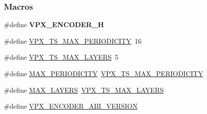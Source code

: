 \subsubsection*{Macros}
\begin{DoxyCompactItemize}
\item 
\hypertarget{group__encoder_gad1f3154e8dfc7058a43a4a8d3c94b8fd}{\#define {\bfseries V\-P\-X\-\_\-\-E\-N\-C\-O\-D\-E\-R\-\_\-\-H}}\label{group__encoder_gad1f3154e8dfc7058a43a4a8d3c94b8fd}

\item 
\#define \hyperlink{group__encoder_ga684b48cb6e47a258247637186557eb19}{V\-P\-X\-\_\-\-T\-S\-\_\-\-M\-A\-X\-\_\-\-P\-E\-R\-I\-O\-D\-I\-C\-I\-T\-Y}~16
\item 
\#define \hyperlink{group__encoder_ga2715ac3dd8bf2f5438c4bbfc82788eb2}{V\-P\-X\-\_\-\-T\-S\-\_\-\-M\-A\-X\-\_\-\-L\-A\-Y\-E\-R\-S}~5
\item 
\#define \hyperlink{group__encoder_gae6569d89cc61cb190aeeb00a1b40ad88}{M\-A\-X\-\_\-\-P\-E\-R\-I\-O\-D\-I\-C\-I\-T\-Y}~\hyperlink{group__encoder_ga684b48cb6e47a258247637186557eb19}{V\-P\-X\-\_\-\-T\-S\-\_\-\-M\-A\-X\-\_\-\-P\-E\-R\-I\-O\-D\-I\-C\-I\-T\-Y}
\item 
\#define \hyperlink{group__encoder_gade9d4b2ac5f29fe89ffea40e7c58c9d6}{M\-A\-X\-\_\-\-L\-A\-Y\-E\-R\-S}~\hyperlink{group__encoder_ga2715ac3dd8bf2f5438c4bbfc82788eb2}{V\-P\-X\-\_\-\-T\-S\-\_\-\-M\-A\-X\-\_\-\-L\-A\-Y\-E\-R\-S}
\item 
\hypertarget{group__encoder_gaa4f0b52293c08ba672429c3a03648b9d}{\#define \hyperlink{group__encoder_gaa4f0b52293c08ba672429c3a03648b9d}{V\-P\-X\-\_\-\-E\-N\-C\-O\-D\-E\-R\-\_\-\-A\-B\-I\-\_\-\-V\-E\-R\-S\-I\-O\-N}}\label{group__encoder_gaa4f0b52293c08ba672429c3a03648b9d}


\end{DoxyCompactItemize}
